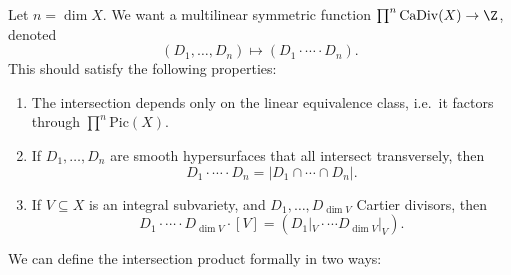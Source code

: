 \documentclass[a4paper]{article}
\newcommand\CaDiv{\mathrm{CaDiv}}
\newcommand\Pic{\mathrm{Pic}}
\begin{document}
Let $n = \dim X$. We want a multilinear symmetric function $\prod^n \CaDiv(X) \to \Z$, denoted
\[
  (D_1, \ldots, D_n) \mapsto (D_1 \cdot \cdots \cdot D_n).
\]
This should satisfy the following properties:
\begin{enumerate}
  \item The intersection depends only on the linear equivalence class, i.e.\ it factors through $\prod^n \Pic(X)$.
  \item If $D_1, \ldots, D_n$ are smooth hypersurfaces that all intersect transversely, then
    \[
      D_1 \cdot \cdots \cdot D_n = |D_1 \cap \cdots \cap D_n|.
    \]
  \item If $V \subseteq X$ is an integral subvariety, and $D_1, \ldots, D_{\dim V}$ Cartier divisors, then
    \[
      D_1 \cdot \cdots \cdot D_{\dim V} \cdot [V] = (D_1|_V \cdot \cdots D_{\dim V}|_V).
    \]
\end{enumerate}
We can define the intersection product formally in two ways:
\end{document}
